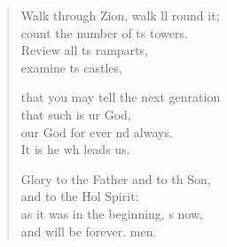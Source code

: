 \begin{verse}
\begin{patverse}
Walk through Zion, walk ll round it;\Med\\
count the number of \pointup{\i}ts towers.\\
Review all \pointup{\i}ts ramparts,\Med\\
examine \pointup{\i}ts castles,

that you may tell the next genration\Med\\
that such is ur God,\\
our God for ever nd always.\Med\\
It is he wh leads us.

Glory to the Father and to th Son,\Med\\
and to the Hol Spirit:\\
as it was in the beginning, \pointup{\i}s now,\Med\\
and will be forever. men. 
  \end{patverse}
\end{verse}
